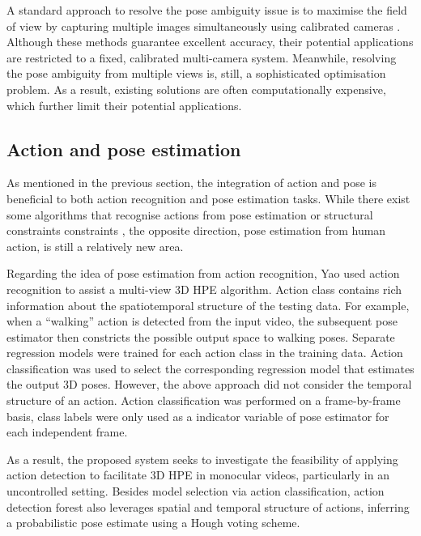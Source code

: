 A standard approach to resolve the pose ambiguity issue is to maximise the field of view by capturing multiple images simultaneously using calibrated cameras \cite{Pons-Moll2011, Sigal2012, Yao2012}.   
Although these methods guarantee excellent accuracy, their potential applications are restricted to a fixed, calibrated multi-camera system. 
Meanwhile, resolving the pose ambiguity from multiple views is, still, a sophisticated optimisation problem. 
As a result, existing solutions are often computationally expensive, which further limit their potential applications.   

\subsection{Action and pose estimation}

As mentioned in the previous section, the integration of action and pose is beneficial to both action recognition and pose estimation tasks. 
While there exist some algorithms that recognise actions from pose estimation or structural constraints constraints \cite{Yu2010, Raja2011}, the opposite direction, \ie pose estimation from human action, is still a relatively new area. 

Regarding the idea of pose estimation from action recognition, Yao \etal \cite{Yao2012} used action recognition to assist a multi-view 3D HPE algorithm. 
Action class contains rich information about the spatiotemporal structure of the testing data. For example, when a ``walking'' action is detected from the input video, the subsequent pose estimator then constricts the possible output space to walking poses.   
Separate regression models were trained for each action class in the training data. 
Action classification was used to select the corresponding regression model that estimates the output 3D poses. 
However, the above approach did not consider the temporal structure of an action.    
Action classification was performed on a frame-by-frame basis, class labels were only used as a indicator variable of pose estimator for each independent frame. 

As a result, the proposed system seeks to investigate the feasibility of applying action detection to facilitate 3D HPE in monocular videos, particularly in an uncontrolled setting. 
Besides model selection via action classification, action detection forest also leverages spatial and temporal structure of actions, inferring a probabilistic pose estimate using a Hough voting scheme.  

